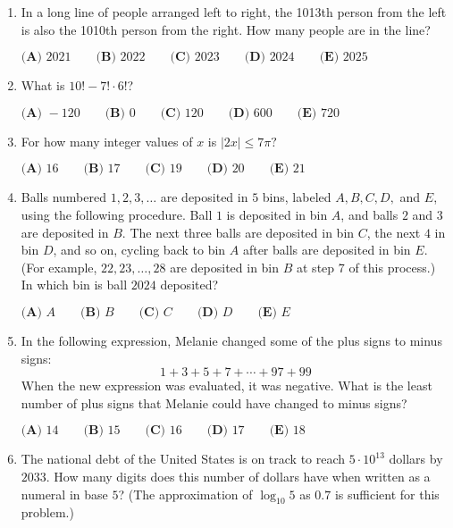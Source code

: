 \documentclass{article}
\begin{document}
\begin{enumerate}[label=\arabic*., itemsep=0.5em]
\item In a long line of people arranged left to right, the 1013th person from the left is also the 1010th person from the right. How many people are in the line?

\(\textbf{(A) } 2021 \qquad\textbf{(B) } 2022 \qquad\textbf{(C) } 2023 \qquad\textbf{(D) } 2024 \qquad\textbf{(E) } 2025\)\par \vspace{0.5em}\item What is \(10! - 7! \cdot 6!\)?

\(\textbf{(A) }-120 \qquad\textbf{(B) }0 \qquad\textbf{(C) }120 \qquad\textbf{(D) }600 \qquad\textbf{(E) }720 \qquad\)\par \vspace{0.5em}\item For how many integer values of \(x\) is \(|2x|\leq 7\pi?\)

\(\textbf{(A) }16 \qquad\textbf{(B) }17\qquad\textbf{(C) }19\qquad\textbf{(D) }20\qquad\textbf{(E) }21\)\par \vspace{0.5em}\item Balls numbered \(1,2,3,\ldots\) are deposited in \(5\) bins, labeled \(A,B,C,D,\) and \(E\), using the following procedure. Ball \(1\) is deposited in bin \(A\), and balls \(2\) and \(3\) are deposited in \(B\). The next three balls are deposited in bin \(C\), the next \(4\) in bin \(D\), and so on, cycling back to bin \(A\) after balls are deposited in bin \(E\). (For example, \(22,23,\ldots,28\) are deposited in bin \(B\) at step 7 of this process.) In which bin is ball \(2024\) deposited?

\(\textbf{(A) }A\qquad\textbf{(B) }B\qquad\textbf{(C) }C\qquad\textbf{(D) }D\qquad\textbf{(E) }E\)\par \vspace{0.5em}\item In the following expression, Melanie changed some of the plus signs to minus signs:
\begin{equation*}
1 + 3+5+7+\cdots+97+99
\end{equation*}
When the new expression was evaluated, it was negative. What is the least number of plus signs that Melanie could have changed to minus signs?

\(
\textbf{(A) }14 \qquad
\textbf{(B) }15 \qquad
\textbf{(C) }16 \qquad
\textbf{(D) }17 \qquad
\textbf{(E) }18 \qquad
\)\par \vspace{0.5em}\item The national debt of the United States is on track to reach \(5 \cdot 10^{13}\) dollars by \(2033\). How many digits does this number of dollars have when written as a numeral in base \(5\)? (The approximation of \(\log_{10} 5\) as \(0.7\) is sufficient for this problem.)


\end{enumerate}
\end{document}
